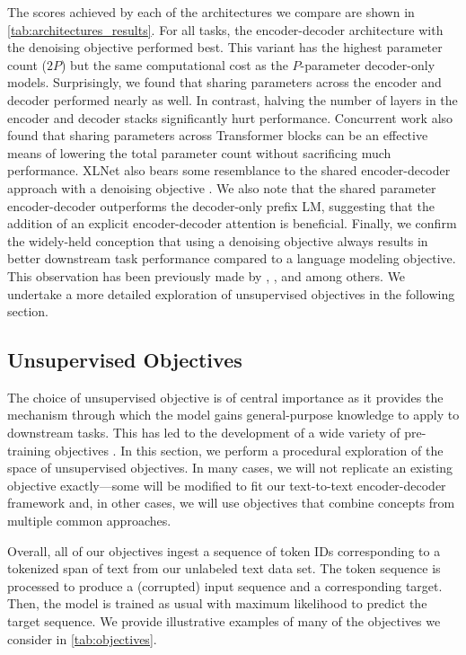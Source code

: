 The scores achieved by each of the architectures we compare are shown in \ref{tab:architectures_results}.
For all tasks, the encoder-decoder architecture with the denoising objective performed best. This variant has the highest parameter count ($2P$) but the same computational cost as the $P$-parameter decoder-only models. Surprisingly, we found that sharing parameters across the encoder and decoder performed nearly as well. In contrast, halving the number of layers in the encoder and decoder stacks significantly hurt performance. Concurrent work \citep{lan2019albert} also found that sharing parameters across Transformer blocks can be an effective means of lowering the total parameter count without sacrificing much performance. XLNet also bears some resemblance to the shared encoder-decoder approach with a denoising objective \citep{yang2019xlnet}. We also note that the shared parameter encoder-decoder outperforms the decoder-only prefix LM, suggesting that the addition of an explicit encoder-decoder attention is beneficial. Finally, we confirm the widely-held conception that using a denoising objective always results in better downstream task performance compared to a language modeling objective. This observation has been previously made by \citet{devlin2018bert}, \citet{voita2019bottom}, and \citet{lample2019cross} among others. We undertake a more detailed exploration of unsupervised objectives in the following section.

\subsection{Unsupervised Objectives}
\label{sec:objectives}

The choice of unsupervised objective is of central importance as it provides the mechanism through which the model gains general-purpose knowledge to apply to downstream tasks. This has led to the development of a wide variety of pre-training objectives \citep{dai2015semi,ramachandran2016unsupervised,radford2018improving,devlin2018bert,yang2019xlnet,liu2019multi,wang2019can,song2019mass,dong2019unified,joshi2019spanbert}. In this section, we perform a procedural exploration of the space of unsupervised objectives. In many cases, we will not replicate an existing objective exactly---some will be modified to fit our text-to-text encoder-decoder framework and, in other cases, we will use objectives that combine concepts from multiple common approaches.

Overall, all of our objectives ingest a sequence of token IDs corresponding to a tokenized span of text from our unlabeled text data set. The token sequence is processed to produce a (corrupted) input sequence and a corresponding target. Then, the model is trained as usual with maximum likelihood to predict the target sequence. We provide illustrative examples of many of the objectives we consider in \ref{tab:objectives}.

